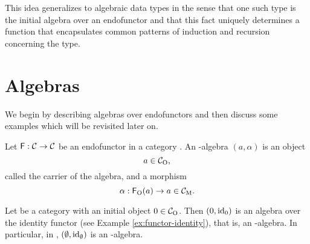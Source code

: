 This idea generalizes to algebraic data types in the sense that one
such type is the initial algebra over an endofunctor and that this
fact uniquely determines a function that encapsulates common patterns
of induction and recursion concerning the type.

\section{Algebras}
\label{sec:algebras}

We begin by describing algebras over endofunctors and then discuss some
examples which will be revisited later on.

\begin{definition}
  \label{def:algebra}


  Let $\mathsf{F}: \mathcal{C} \to \mathcal{C}$ be an endofunctor in a category
  . An -algebra $(a,\alpha)$ is an object
  \begin{equation}
    \label{eq:al-carrier}
    a \in \mathcal{C}_{\operatorname{O}}
    \text{,}
  \end{equation}
  called the carrier of the algebra, and a morphism
  \begin{equation}
    \alpha: \mathsf{F}_{\operatorname{O}}(a) \to a \in \mathcal{C}_{\operatorname{M}}
    \text{.}
  \end{equation}

\end{definition}

\begin{example}
  \label{ex:algebra-initial-object}


  Let  be a category with an initial object $0 \in \mathcal{C}_{\operatorname{O}}$.
  Then $(0,\operatorname{id}_{0})$ is an algebra over the identity functor (see
  Example \ref{ex:functor-identity}), that is, an -algebra. In
  particular, in \set, $(\emptyset,\operatorname{id}_{\emptyset})$ is an
  -algebra.

\end{example}

